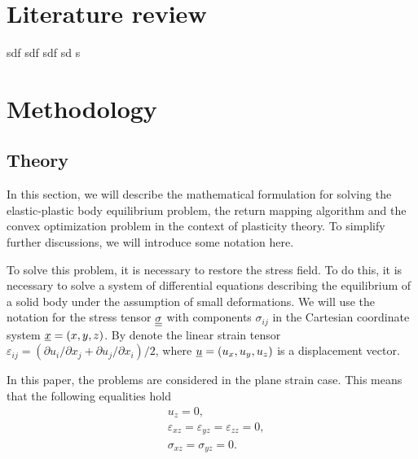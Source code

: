 \documentclass[12pt]{article}
\newcommand{\todounderline}[1]{\todo[inline, size=\scriptsize]{#1}}
\begin{document}
\newpage
\section{Literature review}
sdf \parencite{Coussy} sdf \parencite{BRUNO2020724} sdf \parencite{Numba2015} sd \parencite{diamond2016cvxpy} s \parencite{bib:Domahidi2013ecos}
\todounderline{test}

\newpage
\section{Methodology}

\subsection{Theory}

In this section, we will describe the mathematical formulation for solving the elastic-plastic body equilibrium problem, the return mapping algorithm and the convex optimization problem in the context of plasticity theory. To simplify further discussions, we will introduce some notation here. 

To solve this problem, it is necessary to restore the stress field. To do this, it is necessary to solve a system of differential equations describing the equilibrium of a solid body under the assumption of small deformations. We will use the notation for the stress tensor $\underline{\underline{\sigma}}$ with components $\sigma_{ij}$ in the Cartesian coordinate system $\underline{x} = (x, y, z)$. By denote the linear strain tensor $\varepsilon_{ij}=(\partial u_i/\partial x_j+\partial u_j/\partial x_i)/2$, where $\underline{u}=(u_x, u_y, u_z)$ is a displacement vector.

In this paper, the problems are considered in the plane strain case. This means that the following equalities hold
\begin{align}
    & u_z = 0, \\
    & \varepsilon_{xz} = \varepsilon_{yz} = \varepsilon_{zz} = 0, \\
    & \sigma_{xz} = \sigma_{yz} = 0.
\end{align}
\end{document}
